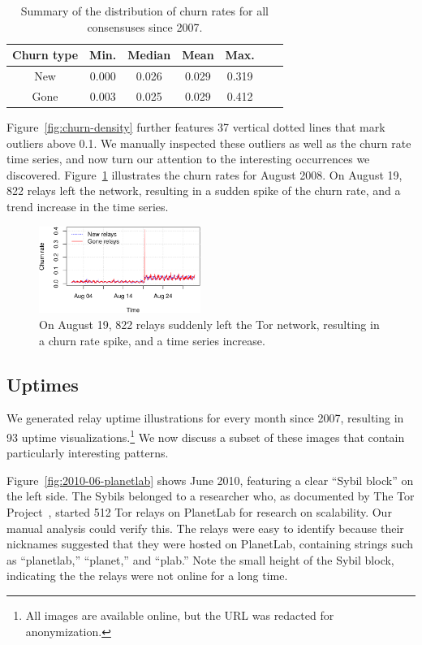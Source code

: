 \begin{table}[t]
	\centering
	\begin{tabular}{ccccccc}
	\textbf{Churn type} & \textbf{Min.} & \textbf{Median} & \textbf{Mean} & \textbf{Max.} \\
	\hline
	New & 0.000 & 0.026 & 0.029 & 0.319 \\
	Gone & 0.003 & 0.025 & 0.029 & 0.412 \\
	\end{tabular}
	\caption{Summary of the distribution of churn rates for all consensuses
	since 2007.}
	\label{tab:churn-dist}
\end{table}

Figure~\ref{fig:churn-density} further features 37 vertical dotted lines that
mark outliers above 0.1.  We manually inspected these outliers as well as the
churn rate time series, and now turn our attention to the interesting
occurrences we discovered.  Figure~\ref{fig:2008-08} illustrates the churn rates
for August 2008.  On August 19, 822 relays left the network, resulting in a
sudden spike of the churn rate, and a trend increase in the time series.

\begin{figure}[t]
	\centering
	\includegraphics[width=0.47\textwidth]{diagrams/2008-08.pdf}
	\caption{On August 19, 822 relays suddenly left the Tor network, resulting in
	a churn rate spike, and a time series increase.}
	\label{fig:2008-08}
\end{figure}

\subsection{Uptimes}
We generated relay uptime illustrations for every month since 2007, resulting in
93 uptime visualizations.\footnote{All images are available online, but the URL
was redacted for anonymization.}  We now discuss a subset of these images that
contain particularly interesting patterns.

Figure~\ref{fig:2010-06-planetlab} shows June 2010, featuring a clear ``Sybil
block'' on the left side.  The Sybils belonged to a researcher who, as
documented by The Tor Project~\cite{progressreport}, started 512 Tor relays on
PlanetLab for research on scalability.  Our manual analysis could verify this.
The relays were easy to identify because their nicknames suggested that they
were hosted on PlanetLab, containing strings such as ``planetlab,'' ``planet,''
and ``plab.''  Note the small height of the Sybil block, indicating the the
relays were not online for a long time.

